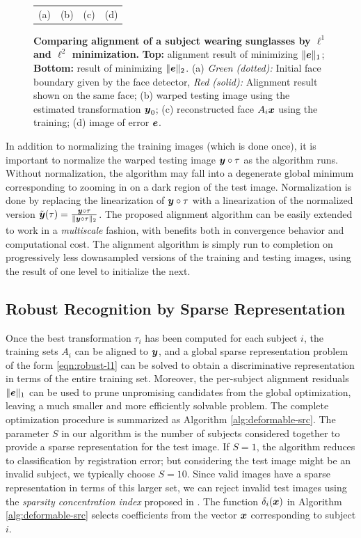 \documentclass[10pt,journal,letterpaper,compsoc]{IEEEtran} %
\begin{document}
\begin{figure}
{\begin{tabular}{cccc}
(a) & (b) & (c) & (d)
\end{tabular}
\vspace{0mm}}
\caption{{\bf Comparing alignment of a subject wearing sunglasses by
$\ell^1$ and $\ell^2$ minimization.}
{\bf Top:} alignment result of minimizing $\|\boldsymbol{e}\|_1$; {\bf Bottom:}
result of minimizing $\|\boldsymbol{e}\|_2$. (a) {\em Green (dotted):} Initial face boundary
given by the face detector, {\em Red (solid):} Alignment result shown on the same
face; (b) warped testing image using the estimated transformation ${\boldsymbol{y}}_0$;
(c) reconstructed face $A_i{\boldsymbol{x}}$ using the training; (d) image of error $\boldsymbol{e}$. }\label{fig:L1-L2-align}
\vspace{-8.0mm}
\end{figure}

In addition to normalizing the training images (which is done
once), it is important to normalize the warped testing image
${\boldsymbol{y}} \circ \tau$ as the algorithm runs.  Without normalization,
the algorithm may fall into a degenerate global minimum
corresponding to zooming in on a dark region of the test
image.  Normalization is done by replacing the linearization of
${\boldsymbol{y}} \circ \tau$ with a linearization of the normalized version
$\tilde {{\boldsymbol{y}}}(\tau) = \frac{{\boldsymbol{y}} \circ \tau}{\|{\boldsymbol{y}} \circ \tau\|_2}$.
The proposed alignment algorithm can be easily extended to work
in a {\em multiscale} fashion, with benefits both in
convergence behavior and computational cost.  The alignment
algorithm is simply run to completion on progressively less
downsampled versions of the training and testing images, using
the result of one level to initialize the next.

\subsection{Robust Recognition by Sparse Representation} Once
the best transformation $\tau_i$ has been computed for each
subject $i$, the training sets $A_i$ can be aligned to ${\boldsymbol{y}}$,
and a global sparse representation problem of the form
\eqref{eqn:robust-l1} can be solved to obtain a discriminative
representation in terms of the entire training set. Moreover,
the per-subject alignment residuals $\| \boldsymbol{e} \|_1$ can be used to
prune unpromising candidates from the global optimization,
leaving a much smaller and more efficiently solvable problem.
The complete optimization procedure is summarized as Algorithm
\ref{alg:deformable-src}. The parameter $S$ in our algorithm is the number of subjects
considered together to provide a sparse representation for the
test image. If $S = 1$, the algorithm reduces to classification
by registration error; but considering the test image might be
an invalid subject, we typically choose $S = 10$. Since valid
images have a sparse representation in terms of this larger
set, we can reject invalid test images using the {\em sparsity
concentration index} proposed in \cite{Wright2009-PAMI}.
The function $\delta_i({\boldsymbol{x}})$ in Algorithm \ref{alg:deformable-src}
selects coefficients from the vector ${\boldsymbol{x}}$ corresponding to subject $i$.
\end{document}
